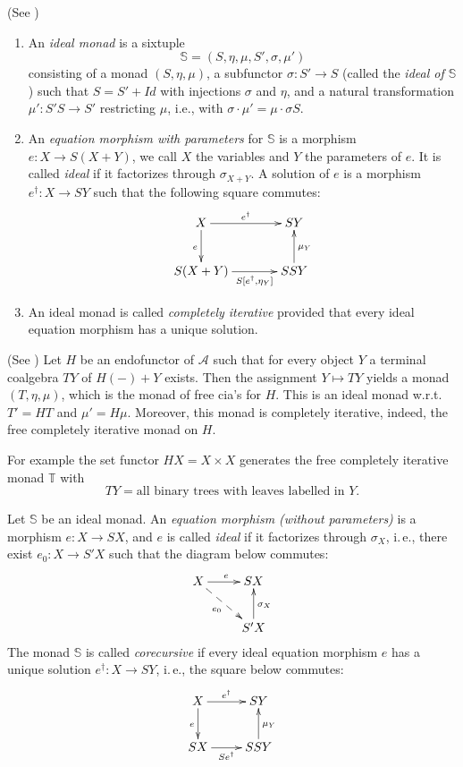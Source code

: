 \documentclass{LMCS}
\theoremstyle{plain}
\theoremstyle{definition}
\numberwithin{equation}{section}
\begin{document}
\begin{defi}(See \cite{aamv})\label{def ideal monad}
\begin{enumerate}
\item An {\it ideal monad} is a sixtuple $$\mathbb{S}=(S,\eta,\mu,S',\sigma,\mu')$$
consisting of a monad $(S,\eta,\mu)$, a subfunctor $\sigma:S'\rightarrow S$ (called the {\it ideal of $\mathbb S$} ) such that $S=S'+Id$ with injections $\sigma$ and $\eta$, and a natural transformation $\mu':S'S\rightarrow S'$ restricting $\mu$, i.e., with $\sigma\cdot\mu'=\mu\cdot\sigma S.$

\item An {\it equation morphism with parameters}  for $\mathbb S$ is a morphism $e:X\rightarrow S(X+Y)$, we call $X$ the variables and $Y$ the parameters of $e$.  It is called {\it ideal} if it factorizes through $\sigma_{X+Y}$. A solution of $e$ is a morphism $e^\dagger :X\rightarrow SY$ such that the following square commutes:
\begin{equation}\label{5.1}\vcenter{
\xymatrix@C+1pc{
X\ar[r]^-{e^\dagger}\ar[d]_e&SY\\
S(X+Y)\ar[r]_-{S[e^\dagger,\eta_Y]}&SSY\ar[u]_{\mu_Y}
}}
\end{equation}
\item An ideal monad is called {\it completely iterative} provided that every ideal equation morphism has a unique solution.
\end{enumerate}
\end{defi}

\begin{exa}(See \cite{aamv})
Let $H$  be an endofunctor of $\mathcal A$ such that for every object $Y$ a terminal coalgebra $TY$ of $H(-)+Y$ exists. Then the assignment $Y\mapsto TY$ yields a monad $(T,\eta,\mu)$, which is the monad of free cia's for $H$. This is an ideal monad w.r.t. $T'=HT$ and $\mu'=H\mu$. Moreover, this monad is completely iterative, indeed, the free completely iterative monad on $H$.

For example the set functor $HX=X\times X$ generates the free completely iterative monad $\mathbb T$ with
$$TY=\text{all binary trees with leaves labelled in $Y$.}$$
\end{exa}

\begin{defi}\label{def corecursive monad}
 Let $\mathbb S$ be an ideal monad. An {\it equation morphism (without parameters)} is a morphism $e:X\rightarrow SX$, and $e$ is called {\it ideal} if it factorizes through $\sigma_X$, i.\,e., there exist $e_0:X\rightarrow S'X$ such that the diagram below commutes:
$$
 \xymatrix{
 X\ar[r]^e\ar@{-->}[rd]_-{e_0}& SX\\
                       &S'X\ar[u]_{\sigma_X}
 }
 $$
The monad $\mathbb S$ is called {\it corecursive} if every ideal
equation morphism $e$ has a unique solution $e^\dagger: X \to SY$, i.\,e.,
the square below commutes:
\[
\xymatrix{
  X 
  \ar[r]^-{e^\dagger}
  \ar[d]_e
  &
  SY
  \\
  SX
  \ar[r]_-{Se^\dagger}
  &
  SSY
  \ar[u]_{\mu_Y}
}
\]
\end{defi}
\end{document}
